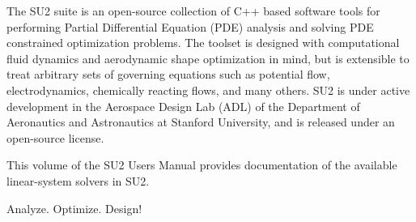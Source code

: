 \documentclass[../main.tex]{subfiles}
\begin{document}
 

The SU2 suite is an open-source collection of C++ based software tools for performing Partial Differential Equation (PDE) analysis and solving PDE constrained optimization problems. The toolset is designed with computational fluid dynamics and aerodynamic shape optimization in mind, but is extensible to treat arbitrary sets of governing equations such as potential flow, electrodynamics, chemically reacting flows, and many others. SU2 is under active development in the Aerospace Design Lab (ADL) of the Department of Aeronautics and Astronautics at Stanford University, and is released under an open-source license.

\vspace{5mm}
This volume of the SU2 Users Manual provides documentation of the available linear-system solvers in SU2.

\vspace{20mm}
\Huge
Analyze. Optimize. Design!
\end{document}

